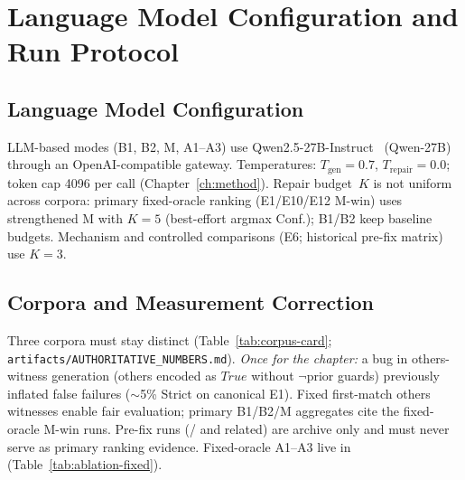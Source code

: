 \section{Language Model Configuration and Run Protocol}
\label{sec:exp:protocol}

\subsection{Language Model Configuration}

LLM-based modes (B1, B2, M, A1--A3) use
Qwen2.5-27B-Instruct~\citep{yang2024qwen25} (\textsf{Qwen-27B}) through an
OpenAI-compatible gateway.
Temperatures: $T_\text{gen}{=}0.7$, $T_\text{repair}{=}0.0$; token cap 4096
per call (Chapter~\ref{ch:method}).
Repair budget~$K$ is not uniform across corpora: primary fixed-oracle ranking
(E1/E10/E12 M-win) uses strengthened M with $K{=}5$ (best-effort argmax
Conf.); B1/B2 keep baseline budgets.
Mechanism and controlled comparisons (E6; historical pre-fix
matrix) use $K{=}3$.

\subsection{Corpora and Measurement Correction}

Three corpora must stay distinct (Table~\ref{tab:corpus-card};
\texttt{artifacts/AUTHORITATIVE\_NUMBERS.md}).
\emph{Once for the chapter:} a bug in others-witness generation
(others encoded as $\mathit{True}$ without $\neg$prior guards) previously
inflated false failures (${\sim}$5\% Strict on canonical E1).
Fixed first-match others witnesses enable fair evaluation; primary B1/B2/M
aggregates cite the fixed-oracle M-win runs.
Pre-fix runs (/
 and related) are archive only and must
never serve as primary ranking evidence.
Fixed-oracle A1--A3 live in 
(Table~\ref{tab:ablation-fixed}).

